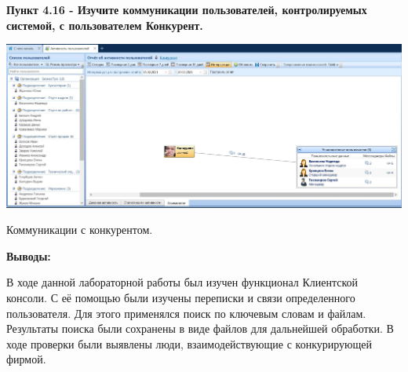 \documentclass[a4paper,14pt]{extarticle}
\begin{document}
    \textbf{Пункт 4.16 - Изучите коммуникации пользователей, контролируемых системой, с
    пользователем Конкурент.}
    \begin{center}
        \includegraphics[scale=0.25]{pics/4.16.jpg}

        Коммуникации с конкурентом.
    \end{center}

    \newpage
    \textbf{Выводы:}

    В ходе данной лабораторной работы был изучен функционал Клиентской консоли. 
    С её помощью были изучены переписки и связи определенного пользователя. 
    Для этого применялся поиск по ключевым словам и файлам. Результаты поиска были 
    сохранены в виде файлов для дальнейшей обработки. В ходе проверки были выявлены 
    люди, взаимодействующие с конкурирующей фирмой. 
    
\end{document}
